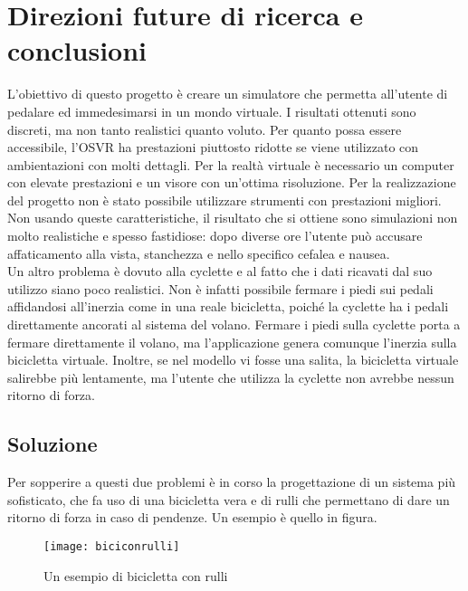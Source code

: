 \chapter{Direzioni future di ricerca e conclusioni}
\label{conclusioni}
\thispagestyle{empty}


\noindent 
L'obiettivo di questo progetto è creare un simulatore che permetta all'utente di pedalare ed immedesimarsi in un mondo virtuale. I risultati ottenuti sono discreti, ma non tanto realistici quanto voluto.
Per quanto possa essere accessibile, l'OSVR ha prestazioni piuttosto ridotte se viene utilizzato con ambientazioni con molti dettagli. Per la realtà virtuale è necessario un computer con elevate prestazioni e un visore con un'ottima risoluzione. Per la realizzazione del progetto non è stato possibile utilizzare strumenti con prestazioni migliori. Non usando queste caratteristiche, il risultato che si ottiene sono simulazioni non molto realistiche e spesso fastidiose: dopo diverse ore l'utente può accusare affaticamento alla vista, stanchezza e nello specifico cefalea e nausea.\\
Un altro problema è dovuto alla cyclette e al fatto che i dati ricavati dal suo utilizzo siano poco realistici. Non è infatti possibile fermare i piedi sui pedali affidandosi all'inerzia come in una reale bicicletta, poiché la cyclette ha i pedali direttamente ancorati al sistema del volano. Fermare i piedi sulla cyclette porta a fermare direttamente il volano, ma l'applicazione genera comunque l'inerzia sulla bicicletta virtuale. Inoltre, se nel modello vi fosse una salita, la bicicletta virtuale salirebbe più lentamente, ma l'utente che utilizza la cyclette non avrebbe nessun ritorno di forza.

\section{Soluzione}
Per sopperire a questi due problemi è in corso la progettazione di un sistema più sofisticato, che fa uso di una bicicletta vera e di rulli che permettano di dare un ritorno di forza in caso di pendenze. Un esempio è quello in figura.
 \begin{figure}[htb]
    \centering
    \texttt{[image: biciconrulli]}
    \caption{Un esempio di bicicletta con rulli\label{fig:biciconrulli}}
\end{figure}

